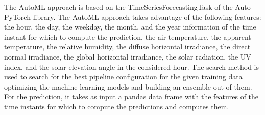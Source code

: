 The AutoML approach is based on the TimeSeriesForecastingTask of the Auto-PyTorch library.
The AutoML approach takes advantage of the following features: the hour, the day, the weekday, the month, and the year information of the time instant for which to compute the prediction, the air temperature, the apparent temperature, the relative humidity, the diffuse horizontal irradiance, the direct normal irradiance, the global horizontal irradiance, the solar radiation, the UV index, and the solar elevation angle in the considered hour.
The search method is used to search for the best pipeline configuration for the given training data optimizing the machine learning models and building an ensemble out of them.
For the prediction, it takes as input a pandas data frame with the features of the time instants for which to compute the predictions and computes them.
